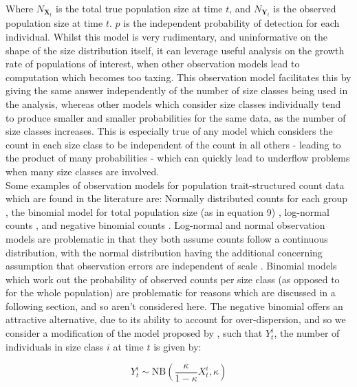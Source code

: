 \documentclass[a4paper,12pt]{article}
\begin{document}
Where $N_{\boldsymbol{X}_t}$ is the total true population size at time $t$, and $N_{\boldsymbol{Y}_t}$ is the observed population size at time $t$. $p$ is the independent probability of detection for each individual. Whilst this model is very rudimentary, and uninformative on the shape of the size distribution itself, it can leverage useful analysis on the growth rate of populations of interest, when other observation models lead to computation which becomes too taxing. This observation model facilitates this by giving the same answer independently of the number of size classes being used in the analysis, whereas other models which consider size classes individually tend to produce smaller and smaller probabilities for the same data, as the number of size classes increases. This is especially true of any model which considers the count in each size class to be independent of the count in all others - leading to the product of many probabilities - which can quickly lead to underflow problems when many size classes are involved. \\

Some examples of observation models for population trait-structured count data which are found in the literature are: Normally distributed counts for each group \citep{Newman, KingBayesianPopEco}, the binomial model for total population size (as in equation 9) \citep{DailMadsen, Royle}, log-normal counts \citep{King2008}, and negative binomial counts \citep{Finke}. Log-normal and normal observation models are problematic in that they both assume counts follow a continuous distribution, with the normal distribution having the additional concerning assumption that observation errors are independent of scale \citep{Finke}. Binomial models which work out the probability of observed counts per size class (as opposed to for the whole population) are problematic for reasons which are discussed in a following section, and so aren't considered here. The negative binomial offers an attractive alternative, due to its ability to account for over-dispersion, and so we consider a modification of the model proposed by \citet{Finke}, such that $Y_t^i$, the number of individuals in size class $i$ at time $t$ is given by:

\begin{equation}
    Y_t^i \sim \text{NB}\left(\frac{\kappa}{1-\kappa}X_t^i, \kappa\right)
\end{equation}
\end{document}
